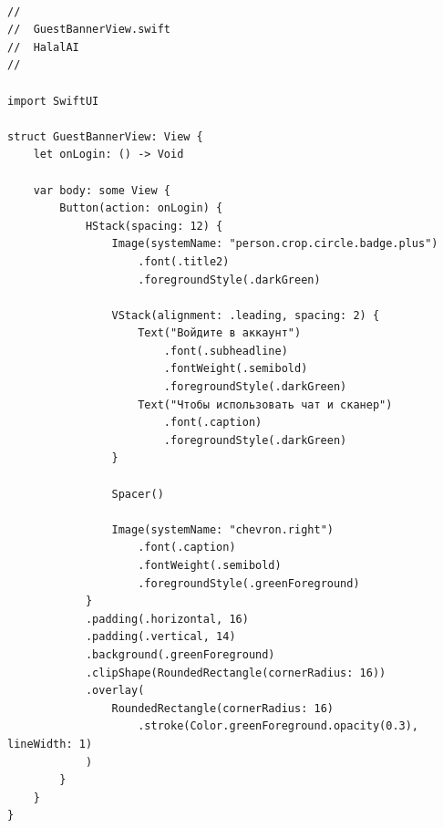 \begin{lstlisting}[basicstyle=\tiny\ttfamily,breaklines=true]

//
//  GuestBannerView.swift
//  HalalAI
//

import SwiftUI

struct GuestBannerView: View {
    let onLogin: () -> Void

    var body: some View {
        Button(action: onLogin) {
            HStack(spacing: 12) {
                Image(systemName: "person.crop.circle.badge.plus")
                    .font(.title2)
                    .foregroundStyle(.darkGreen)

                VStack(alignment: .leading, spacing: 2) {
                    Text("Войдите в аккаунт")
                        .font(.subheadline)
                        .fontWeight(.semibold)
                        .foregroundStyle(.darkGreen)
                    Text("Чтобы использовать чат и сканер")
                        .font(.caption)
                        .foregroundStyle(.darkGreen)
                }

                Spacer()

                Image(systemName: "chevron.right")
                    .font(.caption)
                    .fontWeight(.semibold)
                    .foregroundStyle(.greenForeground)
            }
            .padding(.horizontal, 16)
            .padding(.vertical, 14)
            .background(.greenForeground)
            .clipShape(RoundedRectangle(cornerRadius: 16))
            .overlay(
                RoundedRectangle(cornerRadius: 16)
                    .stroke(Color.greenForeground.opacity(0.3), lineWidth: 1)
            )
        }
    }
}
\end{lstlisting}

